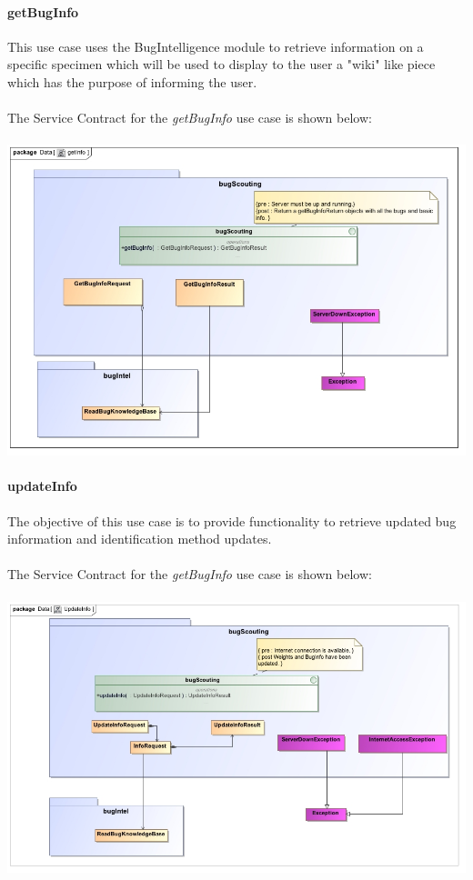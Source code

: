 \documentclass[11pt,a4paper,titlepage]{article}
\begin{document}
		\paragraph{getBugInfo }
		This use case uses the BugIntelligence module to retrieve information on a specific specimen which will be used to display to the user a "wiki" like piece which has the purpose of informing the user.\\\hfill\\
		The Service Contract for the \textit{getBugInfo} use case is shown below:\\\hfill\\
		\includegraphics[width=\linewidth]{getInfo}
		
		\paragraph{updateInfo }
		The objective of this use case is to provide functionality to retrieve updated bug information and identification method updates.\\\hfill\\
		The Service Contract for the \textit{getBugInfo} use case is shown below:\\\hfill\\
		\includegraphics[width=\linewidth]{updateInfo}
		
\end{document}
